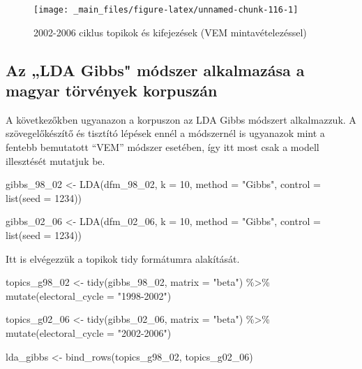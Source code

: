 \documentclass[
]{book}
\newenvironment{Shaded}{\begin{snugshade}}{\end{snugshade}}
\newcommand{\AttributeTok}[1]{\textcolor[rgb]{0.77,0.63,0.00}{#1}}
\newcommand{\DecValTok}[1]{\textcolor[rgb]{0.00,0.00,0.81}{#1}}
\newcommand{\FunctionTok}[1]{\textcolor[rgb]{0.00,0.00,0.00}{#1}}
\newcommand{\NormalTok}[1]{#1}
\newcommand{\OtherTok}[1]{\textcolor[rgb]{0.56,0.35,0.01}{#1}}
\newcommand{\SpecialCharTok}[1]{\textcolor[rgb]{0.00,0.00,0.00}{#1}}
\newcommand{\StringTok}[1]{\textcolor[rgb]{0.31,0.60,0.02}{#1}}
\begin{document}
\begin{figure}

{\centering \texttt{[image: \_main\_files/figure-latex/unnamed-chunk-116-1]} 

}

\caption{2002-2006 ciklus topikok és kifejezések (VEM mintavételezéssel)}\label{fig:unnamed-chunk-116}
\end{figure}

\hypertarget{az-lda-gibbs-muxf3dszer-alkalmazuxe1sa-a-magyar-tuxf6rvuxe9nyek-korpuszuxe1n}{%
\subsection{Az „LDA Gibbs" módszer alkalmazása a magyar törvények
korpuszán}\label{az-lda-gibbs-muxf3dszer-alkalmazuxe1sa-a-magyar-tuxf6rvuxe9nyek-korpuszuxe1n}}

A következőkben ugyanazon a korpuszon az LDA Gibbs módszert alkalmazzuk.
A szövegelőkészítő és tisztító lépések ennél a módszernél is ugyanazok
mint a fentebb bemutatott ``VEM'' módszer esetében, így itt most csak a
modell illesztését mutatjuk be.

\begin{Shaded}
\begin{Highlighting}[]

\NormalTok{gibbs\_98\_02 }\OtherTok{\textless{}{-}} \FunctionTok{LDA}\NormalTok{(dfm\_98\_02, }\AttributeTok{k =} \DecValTok{10}\NormalTok{, }\AttributeTok{method =} \StringTok{"Gibbs"}\NormalTok{, }\AttributeTok{control =} \FunctionTok{list}\NormalTok{(}\AttributeTok{seed =} \DecValTok{1234}\NormalTok{))}

\NormalTok{gibbs\_02\_06 }\OtherTok{\textless{}{-}} \FunctionTok{LDA}\NormalTok{(dfm\_02\_06, }\AttributeTok{k =} \DecValTok{10}\NormalTok{, }\AttributeTok{method =} \StringTok{"Gibbs"}\NormalTok{, }\AttributeTok{control =} \FunctionTok{list}\NormalTok{(}\AttributeTok{seed =} \DecValTok{1234}\NormalTok{))}
\end{Highlighting}
\end{Shaded}

Itt is elvégezzük a topikok tidy formátumra alakítását.

\begin{Shaded}
\begin{Highlighting}[]
\NormalTok{topics\_g98\_02 }\OtherTok{\textless{}{-}} \FunctionTok{tidy}\NormalTok{(gibbs\_98\_02, }\AttributeTok{matrix =} \StringTok{"beta"}\NormalTok{) }\SpecialCharTok{\%\textgreater{}\%}
  \FunctionTok{mutate}\NormalTok{(}\AttributeTok{electoral\_cycle =} \StringTok{"1998{-}2002"}\NormalTok{)}

\NormalTok{topics\_g02\_06 }\OtherTok{\textless{}{-}} \FunctionTok{tidy}\NormalTok{(gibbs\_02\_06, }\AttributeTok{matrix =} \StringTok{"beta"}\NormalTok{) }\SpecialCharTok{\%\textgreater{}\%}
  \FunctionTok{mutate}\NormalTok{(}\AttributeTok{electoral\_cycle =} \StringTok{"2002{-}2006"}\NormalTok{)}

\NormalTok{lda\_gibbs }\OtherTok{\textless{}{-}} \FunctionTok{bind\_rows}\NormalTok{(topics\_g98\_02, topics\_g02\_06)}
\end{Highlighting}
\end{Shaded}
\end{document}
